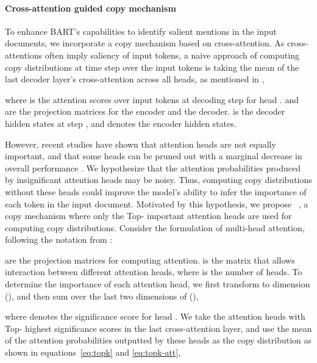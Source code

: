 \documentclass[11pt]{article}
\begin{document}
\paragraph{Cross-attention guided copy mechanism}
To enhance \textsc{BART}'s capabilities to identify salient mentions in the input documents, we incorporate a copy mechanism based on cross-attention. As cross-attentions often imply saliency of input tokens, a naive approach of computing copy distributions  at time step  over the input tokens is taking the mean of the last decoder layer's cross-attention across all heads, as mentioned in \citet{xu-etal-2020-self},

{
\vspace{-4mm}
\small

}where  is the attention scores over input tokens at decoding step  for head .  and  are the projection matrices for the encoder and the decoder.  is the decoder hidden states at step , and  denotes the encoder hidden states. 

However, recent studies have shown that attention heads are not equally important, and that some heads can be pruned out with a marginal decrease in overall performance \cite{voita-etal-2019-analyzing, NEURIPS2019_2c601ad9}. We hypothesize that the attention probabilities produced by insignificant attention heads may be noisy. Thus, computing copy distributions without these heads could improve the model's ability to infer the importance of each token in the input document. Motivated by this hypothesis, we propose \topkcopy\ , a copy mechanism where only the Top- important attention heads are used for computing copy distributions. Consider the formulation of multi-head attention, following the notation from \citet{ashish-etal-2017-attention}: 

{
\vspace{-4mm}
\small

}
 are the projection matrices for computing attention.  is the matrix that allows interaction between different attention heads, where  is the number of heads. To determine the importance of each attention head, we first transform  to dimension  (), and then sum over the last two dimensions of  (), 

{
\small

}
where  denotes the significance score for head . We take the attention heads with Top- highest significance scores in the last cross-attention layer, and use the mean of the attention probabilities outputted by these heads as the copy distribution as shown in equations~\ref{eq:topk} and \ref{eq:topk-att},
\end{document}
